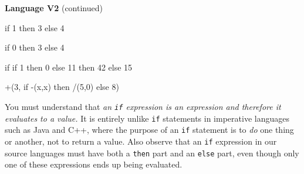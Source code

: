 \begin{minipage}[t]{\sw}
\slidenumber
\LARGE
{\bf Language V2} (continued)
\Large
\begin{qv}
if 1 then 3 else 4

if 0 then 3 else 4

if
  if 1 then 0 else 11
then
  42
else
  15

+(3, if -(x,x) then /(5,0) else 8)
\end{qv}
\LARGE
You must understand that
{\em an \verb'if' expression is an expression
and therefore it evaluates to a value.}
It is entirely unlike \verb'if' statements
in imperative languages such as Java and C++,
where the purpose of an \verb'if' statement
is to {\em do} one thing or another, not to return a value.
Also observe that an \verb'if' expression in our source languages
must have both a \verb'then' part and an \verb'else' part,
even though only one of these expressions ends up being evaluated.
\end{minipage}
\clearpage
